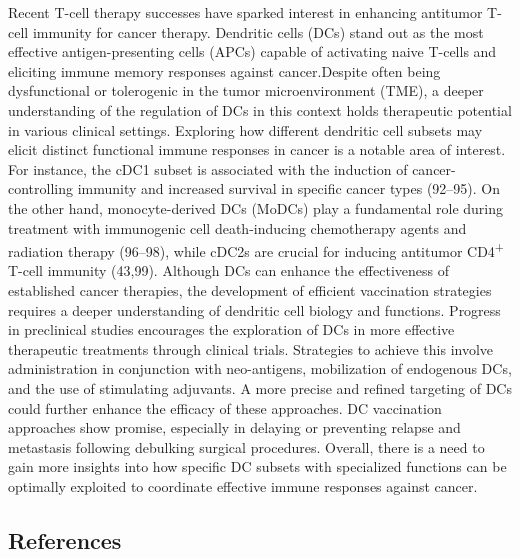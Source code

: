 \documentclass[
]{article}
\begin{document}
Recent T-cell therapy successes have sparked interest in enhancing
antitumor T-cell immunity for cancer therapy. Dendritic cells (DCs)
stand out as the most effective antigen-presenting cells (APCs) capable
of activating naive T-cells and eliciting immune memory responses
against cancer.Despite often being dysfunctional or tolerogenic in the
tumor microenvironment (TME), a deeper understanding of the regulation
of DCs in this context holds therapeutic potential in various clinical
settings. Exploring how different dendritic cell subsets may elicit
distinct functional immune responses in cancer is a notable area of
interest. For instance, the cDC1 subset is associated with the induction
of cancer-controlling immunity and increased survival in specific cancer
types (92--95). On the other hand, monocyte-derived DCs (MoDCs) play a
fundamental role during treatment with immunogenic cell death-inducing
chemotherapy agents and radiation therapy (96--98), while cDC2s are
crucial for inducing antitumor CD4\textsuperscript{+} T-cell immunity
(43,99). Although DCs can enhance the effectiveness of established
cancer therapies, the development of efficient vaccination strategies
requires a deeper understanding of dendritic cell biology and functions.
Progress in preclinical studies encourages the exploration of DCs in
more effective therapeutic treatments through clinical trials.
Strategies to achieve this involve administration in conjunction with
neo-antigens, mobilization of endogenous DCs, and the use of stimulating
adjuvants. A more precise and refined targeting of DCs could further
enhance the efficacy of these approaches. DC vaccination approaches show
promise, especially in delaying or preventing relapse and metastasis
following debulking surgical procedures. Overall, there is a need to
gain more insights into how specific DC subsets with specialized
functions can be optimally exploited to coordinate effective immune
responses against cancer.

\subsection{References}\label{references}
\end{document}
